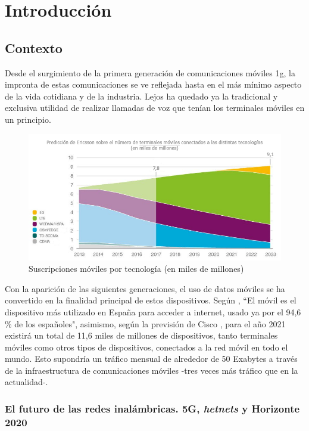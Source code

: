 \chapter{Introducción}\label{cap.introduccion}
\section{Contexto}
Desde el surgimiento de la primera generación de comunicaciones móviles \ac{1g}, la impronta de estas comunicaciones se ve reflejada hasta en el más mínimo aspecto de la vida cotidiana y de la industria. Lejos ha quedado ya la tradicional y exclusiva utilidad de realizar llamadas de voz que tenían los terminales móviles en un principio.

\begin{figure}[hb]
	\centering
    \includegraphics[width=1\linewidth]{imagenes/5gforecast.PNG}
	\caption{Suscripciones móviles por tecnología (en miles de millones) \cite{5gForecastEricsson}}
	\label{fig:5gforecast}
\end{figure}

Con la aparición de las siguientes generaciones, el uso de datos móviles se ha convertido en la finalidad principal de estos dispositivos. Según \cite{informeInicial}, ``El móvil es el dispositivo más utilizado en España para acceder a internet, usado ya por el 94,6 \% de los españoles", asimismo, según la previsión de Cisco \cite{informeInicialCisco}, para el año 2021 existirá un total de 11,6 miles de millones de dispositivos, tanto terminales móviles como otros tipos de dispositivos, conectados a la red móvil en todo el mundo. Esto supondría un tráfico mensual de alrededor de 50 Exabytes a través de la infraestructura de comunicaciones móviles -tres veces más tráfico que en la actualidad-.

\subsection{El futuro de las redes inalámbricas. 5G, \textit{hetnets} y Horizonte 2020}

